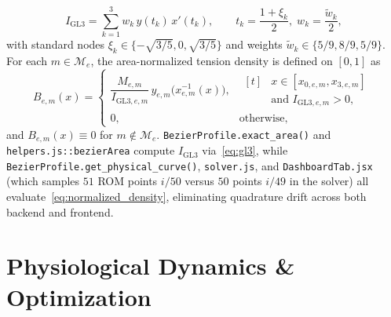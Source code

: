 \documentclass[10pt,twocolumn,letterpaper]{article}
\theoremstyle{plain}
\theoremstyle{definition}
\begin{document}
\begin{equation}
  I_{\mathrm{GL3}} = \sum_{k=1}^{3} w_k\, y(t_k)\, x'(t_k), \qquad
  t_k = \frac{1 + \xi_k}{2},\; w_k = \frac{\tilde{w}_k}{2},
  \label{eq:gl3}
\end{equation}
with standard nodes $\xi_k \in \{-\sqrt{3/5}, 0, \sqrt{3/5}\}$ and weights $\tilde{w}_k \in \{5/9, 8/9, 5/9\}$. For each $m \in \mathcal{M}_e$, the area-normalized tension density is defined on $[0, 1]$ as
\begin{equation}
  B_{e,m}(x) =
  \begin{cases}
    \dfrac{M_{e,m}}{I_{\mathrm{GL3},e,m}}\, y_{e,m}\bigl(x_{e,m}^{-1}(x)\bigr), &
    \begin{aligned}[t]
      &x \in [x_{0,e,m}, x_{3,e,m}] \\
      &\text{and } I_{\mathrm{GL3},e,m} > 0,
    \end{aligned} \\
    0, & \text{otherwise},
  \end{cases}
  \label{eq:normalized_density}
\end{equation}
and $B_{e,m}(x) \equiv 0$ for $m \notin \mathcal{M}_e$. \texttt{BezierProfile.exact\_area()} and \texttt{helpers.js::bezierArea} compute $I_{\mathrm{GL3}}$ via~\eqref{eq:gl3}, while \texttt{BezierProfile.get\_physical\_curve()}, \texttt{solver.js}, and \texttt{DashboardTab.jsx} (which samples $51$ ROM points $i/50$ versus $50$ points $i/49$ in the solver) all evaluate~\eqref{eq:normalized_density}, eliminating quadrature drift across both backend and frontend.

\section{Physiological Dynamics \texorpdfstring{\&}{and} Optimization}
\label{sec:metrics_solver}
\end{document}
